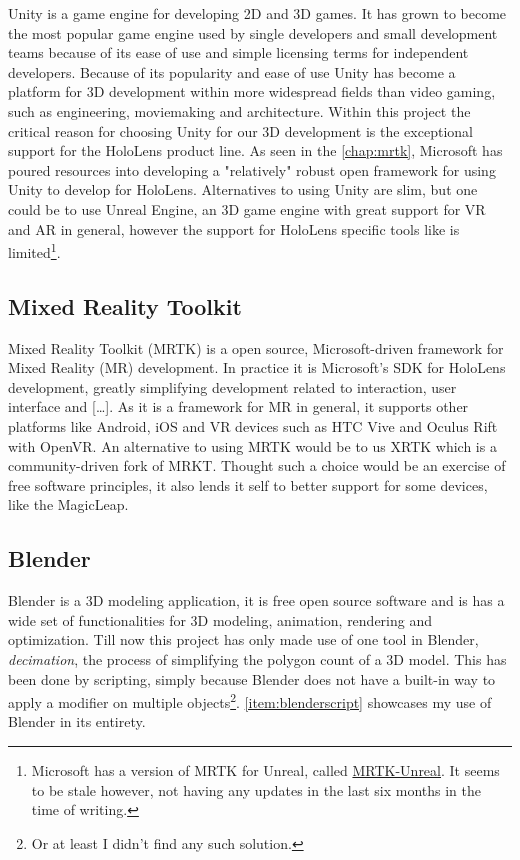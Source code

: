Unity is a game engine for developing 2D and 3D games. It has grown to become the most popular game engine used by single developers and small development teams because of its ease of use and simple licensing terms for independent developers. Because of its popularity  and ease of use Unity has become a platform for 3D development within more widespread fields than video gaming, such as engineering, moviemaking and architecture. 
Within this project the critical reason for choosing Unity for our 3D development is the exceptional support for the HoloLens product line. As seen in the \autoref{chap:mrtk}, Microsoft has poured resources into developing a "relatively" robust open framework for using Unity to develop for HoloLens. 
Alternatives to using Unity are slim, but one could be to use Unreal Engine, an 3D game engine with great support for VR and AR in general, however the support for HoloLens specific tools like  is limited\footnote{Microsoft has a version of MRTK for Unreal, called \href{https://github.com/microsoft/MixedRealityToolkit-Unreal}{MRTK-Unreal}. It seems to be stale however, not having any updates in the last six months in the time of writing.}.

\subsection*{Mixed Reality Toolkit}\label{chap:mrtk}
Mixed Reality Toolkit (MRTK) is a open source, Microsoft-driven framework for Mixed Reality (MR) development. In practice it is Microsoft's SDK for HoloLens development, greatly simplifying development related to interaction, user interface and  [\dots]. As it is a framework for MR in general, it supports other platforms like Android, iOS and VR devices such as HTC Vive and Oculus Rift with OpenVR. 
An alternative to using MRTK would be to us XRTK which is a community-driven fork of MRKT. Thought such a choice would be an exercise of free software principles, it also lends it self to better support for some devices, like the MagicLeap.



\subsection*{Blender}

Blender is a 3D modeling application, it is free open source software and is has a wide set of functionalities for 3D modeling, animation, rendering and optimization. Till now this project has only made use of one tool in Blender, \textit{decimation}, the process of simplifying the polygon count of a 3D model. This has been done by scripting, simply because Blender does not have a built-in way to apply a modifier on multiple objects\footnote{Or at least I didn't find any such solution.}. \autoref{item:blenderscript} showcases my use of Blender in its entirety.


